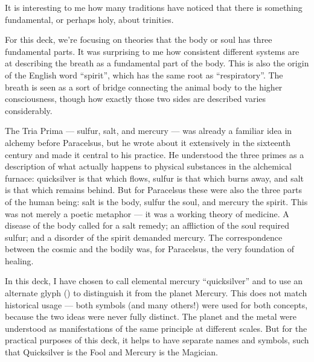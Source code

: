 \documentclass[openright]{book}
\begin{document}
\begin{center}
\end{center}
\vfill\null

\newpage

\noindent It is interesting to me how many traditions have noticed that there is something fundamental, or perhaps holy, about trinities.

For this deck, we're focusing on theories that the body or soul has three fundamental parts. It was surprising to me how consistent different systems are at describing the breath as a fundamental part of the body. This is also the origin of the English word ``spirit'', which has the same root as ``respiratory''. The breath is seen as a sort of bridge connecting the animal body to the higher consciousness, though how exactly those two sides are described varies considerably.

The Tria Prima --- sulfur, salt, and mercury --- was already a familiar idea in alchemy before Paracelsus, but he wrote about it extensively in the sixteenth century and made it central to his practice. He understood the three primes as a description of what actually happens to physical substances in the alchemical furnace: quicksilver is that which flows, sulfur is that which burns away, and salt is that which remains behind. But for Paracelsus these were also the three parts of the human being: salt is the body, sulfur the soul, and mercury the spirit. This was not merely a poetic metaphor --- it was a working theory of medicine. A disease of the body called for a salt remedy; an affliction of the soul required sulfur; and a disorder of the spirit demanded mercury. The correspondence between the cosmic and the bodily was, for Paracelsus, the very foundation of healing.

In this deck, I have chosen to call elemental mercury ``quicksilver'' and to use an alternate glyph (\textmercury) to distinguish it from the planet Mercury. This does not match historical usage --- both symbols (and many others!) were used for both concepts, because the two ideas were never fully distinct. The planet and the metal were understood as manifestations of the same principle at different scales. But for the practical purposes of this deck, it helps to have separate names and symbols, such that Quicksilver is the Fool and Mercury is the Magician.
\end{document}
